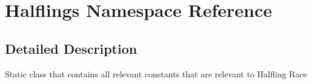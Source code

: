 \hypertarget{namespace_halflings}{}\section{Halflings Namespace Reference}
\label{namespace_halflings}


\subsection{Detailed Description}
Static class that contains all relevant constants that are relevant to Halfling Race 